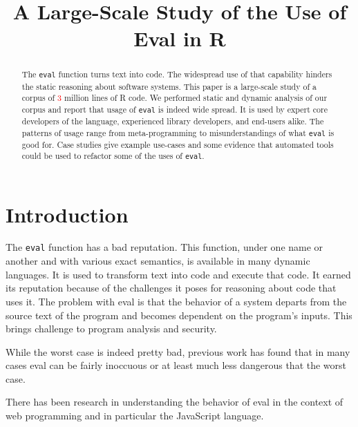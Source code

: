 \documentclass[conference]{IEEEtran}
\begin{document}
\title{A Large-Scale Study of the Use of Eval in R}
\author{\vspace{-.8cm}%
}  
\maketitle

\renewcommand{\c}[1]{{\texttt{#1}}\xspace}
\newcommand{\miss}[1]{{\textcolor{red}{#1}}\xspace}

\begin{abstract}
  The \c{eval} function turns text into code. The widespread use of that
  capability hinders the static reasoning about software systems. This paper
  is a large-scale study of a corpus of \miss{3} million lines of R code.
  We performed static and dynamic analysis of our corpus and report that
  usage of \c{eval} is indeed wide spread. It is used by expert core
  developers of the language, experienced library developers, and end-users
  alike. The patterns of usage range from meta-programming to
  misunderstandings of what \c{eval} is good for. Case studies give example
  use-cases and some evidence that automated tools could be used to refactor
  some of the uses of \c{eval}.
\end{abstract}

\section{Introduction}

The \c{eval} function has a bad reputation. This function, under one name or
another and with various exact semantics, is available in many dynamic
languages. It is used to transform text into code and execute that code.  It
earned its reputation because of the challenges it poses for reasoning about
code that uses it.  The problem with eval is that the behavior of a system
departs from the source text of the program and becomes dependent on the
program's inputs. This brings challenge to program analysis and security.

While the worst case is indeed pretty bad, previous work has found that
in many cases eval can be fairly inoccuous or at least much less dangerous
that the worst case.

There has been research in understanding the behavior of eval in the context
of web programming and in particular the JavaScript language.
\end{document}
